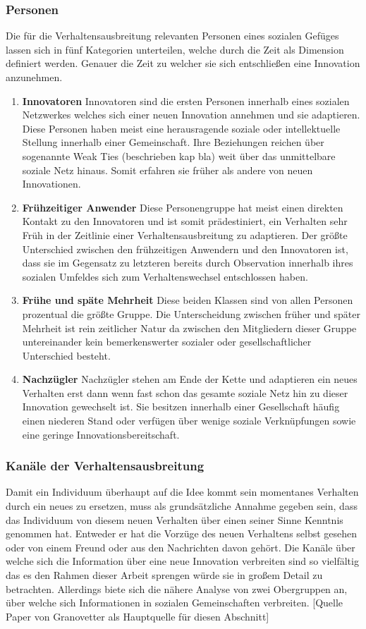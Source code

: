 \documentclass[12pt]{article}
\begin{document}
\subsubsection{Personen}
Die für die Verhaltensausbreitung relevanten Personen eines sozialen Gefüges lassen sich in fünf Kategorien unterteilen, welche durch die Zeit als Dimension definiert werden. Genauer die Zeit zu welcher sie sich entschließen eine Innovation anzunehmen.
\begin{enumerate}
\item \textbf{Innovatoren} Innovatoren sind die ersten Personen innerhalb eines sozialen Netzwerkes welches sich einer neuen Innovation annehmen und sie adaptieren. Diese Personen haben meist eine herausragende soziale oder intellektuelle Stellung innerhalb einer Gemeinschaft. Ihre Beziehungen reichen über sogenannte Weak Ties (beschrieben kap bla) weit über das unmittelbare soziale Netz hinaus. Somit erfahren sie früher als andere von neuen Innovationen.
\item \textbf{Frühzeitiger Anwender} Diese Personengruppe hat meist einen direkten Kontakt zu den Innovatoren und ist somit prädestiniert, ein Verhalten sehr Früh in der Zeitlinie einer Verhaltensausbreitung zu adaptieren. Der größte Unterschied zwischen den frühzeitigen Anwendern und den Innovatoren ist, dass sie im Gegensatz zu letzteren bereits durch Observation innerhalb ihres sozialen Umfeldes sich zum Verhaltenswechsel entschlossen haben.
\item \textbf{Frühe und späte Mehrheit} Diese beiden Klassen sind von allen Personen prozentual die größte Gruppe. Die Unterscheidung zwischen früher und später Mehrheit ist rein zeitlicher Natur da zwischen den Mitgliedern dieser Gruppe untereinander kein bemerkenswerter sozialer oder gesellschaftlicher Unterschied besteht.
\item \textbf{Nachzügler} Nachzügler stehen am Ende der Kette und adaptieren ein neues Verhalten erst dann wenn fast schon das gesamte soziale Netz hin zu dieser Innovation gewechselt ist. Sie besitzen innerhalb einer Gesellschaft häufig einen niederen Stand oder verfügen über wenige soziale Verknüpfungen sowie eine geringe Innovationsbereitschaft.
\end{enumerate}
\subsubsection{Kanäle der Verhaltensausbreitung}
\label{intro_ties}
Damit ein Individuum überhaupt auf die Idee kommt sein momentanes Verhalten durch ein neues zu ersetzen, muss als grundsätzliche Annahme gegeben sein, dass das Individuum von diesem neuen Verhalten über einen seiner Sinne Kenntnis genommen hat. Entweder er hat die Vorzüge des neuen Verhaltens selbst gesehen oder von einem Freund oder aus den Nachrichten davon gehört. Die Kanäle über welche sich die Information über eine neue Innovation verbreiten sind so vielfältig das es den Rahmen dieser Arbeit sprengen würde sie in großem Detail zu betrachten. Allerdings biete sich die nähere Analyse von zwei Obergruppen an, über welche sich Informationen in sozialen Gemeinschaften verbreiten.
[Quelle Paper von Granovetter als Hauptquelle für diesen Abschnitt]
\end{document}
